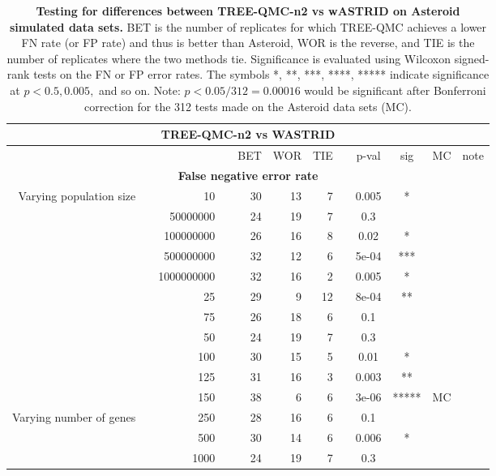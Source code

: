 \begin{table}[!h]
\caption[Statistical testing for TREE-QMC-n2 vs wASTRID on Asteroid data]{
\textbf{Testing for differences between TREE-QMC-n2 vs wASTRID on Asteroid simulated data sets.}
BET is the number of replicates for which TREE-QMC achieves a lower FN rate (or FP rate) and thus is better than Asteroid, WOR is the reverse, and TIE is the number of replicates where the two methods tie.
Significance is evaluated using Wilcoxon signed-rank tests on the FN or FP error rates.
The symbols *, **, ***, ****, ***** indicate significance at $p < 0.5, 0.005,$ and so on.
Note: $p < 0.05 / 312 = 0.00016$ would be significant after Bonferroni correction for the 312 tests made on the Asteroid data sets (MC).}
\centering
\scriptsize
\begin{tabular}{r r r l r r r l c c c l}
\toprule 
\multicolumn{12}{c}{\textbf{TREE-QMC-n2 vs WASTRID}} \\
\midrule
\multirow{ 1}{2cm}{}
& & & & BET & WOR & TIE & & p-val & sig & MC & note \\
\midrule
\multicolumn{12}{c}{\textbf{False negative error rate}} \\
\midrule
\multirow{ 6}{2cm}{Varying population size}
 & & 10 & & 30 & 13 & 7 & & 0.005 & * &  &  \\
   & & 50000000 & & 24 & 19 & 7 & & 0.3 &  &  &  \\
   & & 100000000 & & 26 & 16 & 8 & & 0.02 & * &  &  \\
   & & 500000000 & & 32 & 12 & 6 & & 5e-04 & *** &  &  \\
   & & 1000000000 & & 32 & 16 & 2 & & 0.005 & * &  &  \\
\midrule
\multirow{ 6}{2cm}{Varying number of taxa}
   & & 25 & & 29 & 9 & 12 & & 8e-04 & ** &  &  \\
   & & 75 & & 26 & 18 & 6 & & 0.1 &  &  &  \\
   & & 50 & & 24 & 19 & 7 & & 0.3 &  &  &  \\
   & & 100 & & 30 & 15 & 5 & & 0.01 & * &  &  \\
   & & 125 & & 31 & 16 & 3 & & 0.003 & ** &  &  \\
   & & 150 & & 38 & 6 & 6 & & 3e-06 & ***** & MC &  \\
\midrule
\multirow{ 4}{2cm}{Varying number of genes}
   & & 250 & & 28 & 16 & 6 & & 0.1 &  &  &  \\
   & & 500 & & 30 & 14 & 6 & & 0.006 & * &  &  \\
   & & 1000 & & 24 & 19 & 7 & & 0.3 &  &  &  \\

\end{tabular}
\end{table}
